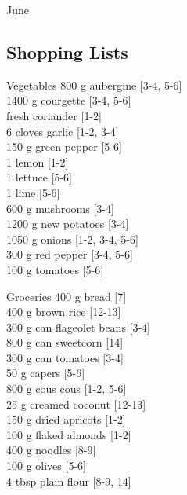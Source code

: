 \begin{menu}{June}
    \subsection*{Shopping Lists}
      \begin{shoppinglist}{Vegetables}
      800 g aubergine {\scriptsize[3-4, 5-6]}\\
      1400 g courgette {\scriptsize[3-4, 5-6]}\\
       fresh coriander {\scriptsize[1-2]}\\
      6 cloves garlic {\scriptsize[1-2, 3-4]}\\
      150 g green pepper {\scriptsize[5-6]}\\
      1  lemon {\scriptsize[1-2]}\\
      1  lettuce {\scriptsize[5-6]}\\
      1  lime {\scriptsize[5-6]}\\
      600 g mushrooms {\scriptsize[3-4]}\\
      1200 g new potatoes {\scriptsize[3-4]}\\
      1050 g onions {\scriptsize[1-2, 3-4, 5-6]}\\
      300 g red pepper {\scriptsize[3-4, 5-6]}\\
      100 g tomatoes {\scriptsize[5-6]}\\
      \end{shoppinglist}%
      \begin{shoppinglist}{Groceries}
      400 g bread {\scriptsize[7]}\\
      400 g brown rice {\scriptsize[12-13]}\\
      300 g can flageolet beans {\scriptsize[3-4]}\\
      800 g can sweetcorn {\scriptsize[14]}\\
      300 g can tomatoes {\scriptsize[3-4]}\\
      50 g capers {\scriptsize[5-6]}\\
      800 g cous cous {\scriptsize[1-2, 5-6]}\\
      25 g creamed coconut {\scriptsize[12-13]}\\
      150 g dried apricots {\scriptsize[1-2]}\\
      100 g flaked almonds {\scriptsize[1-2]}\\
      400 g noodles {\scriptsize[8-9]}\\
      100 g olives {\scriptsize[5-6]}\\
      4 tbsp plain flour {\scriptsize[8-9, 14]}\\

\end{shoppinglist}
\end{menu}
